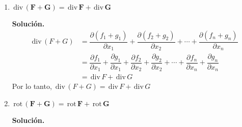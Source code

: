 \documentclass[fleqn, 12pt]{article}
\newcommand{\derivadaparcial}[2]{\dfrac{\partial {#1}}{\partial {#2}}}
\newcommand{\rot}{\mathrm{\, rot \,}}
\newcommand{\dive}{\mathrm{\, div \,}}
\begin{document}
\begin{enumerate}
        \item $ \mathbf{\dive (F + G) = \dive F + \dive G} $
        
        \textbf{Solución.}
        \begin{align*}
            \dive (F + G) &= \derivadaparcial{(f_1 + g_1)}{x_1} + \derivadaparcial{(f_2 + g_2)}{x_2} + \cdots + \derivadaparcial{(f_n + g_n)}{x_n} \\
            &= \derivadaparcial{f_1}{x_1} + \derivadaparcial{g_1}{x_1} + \derivadaparcial{f_2}{x_2} + \derivadaparcial{g_2}{x_2} + \cdots + \derivadaparcial{f_n}{x_n} + \derivadaparcial{g_n}{x_n} \\
            &= \dive F + \dive G
        \end{align*}
        Por lo tanto, $ \dive (F + G) = \dive F + \dive G $ \\

        \item $ \mathbf{\rot (F + G) = \rot F + \rot G} $
        
        \textbf{Solución.}


\end{enumerate}
\end{document}
